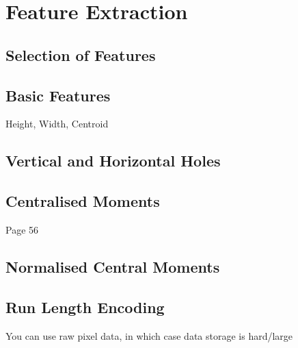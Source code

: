 \section{Feature Extraction}

\subsection{Selection of Features}

\subsection{Basic Features}
Height, Width, Centroid

\subsection{Vertical and Horizontal Holes}

\subsection{Centralised Moments}
Page 56

\subsection{Normalised Central Moments}

\subsection{Run Length Encoding}
You can use raw pixel data, in which case data storage is hard/large

